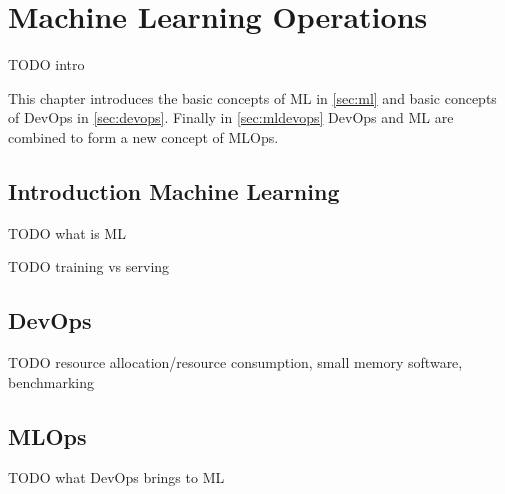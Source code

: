 \chapter{Machine Learning Operations}

TODO intro

This chapter introduces the basic concepts of ML in \autoref{sec:ml} and basic concepts of DevOps in \autoref{sec:devops}. Finally in \autoref{sec:mldevops} DevOps and ML are combined to form a new concept of MLOps.

\section{Introduction Machine Learning}
\label{sec:ml}

TODO what is ML

TODO training vs serving

\section{DevOps}
\label{sec:devops}

TODO resource allocation/resource consumption, small memory software, benchmarking

\section{MLOps}
\label{sec:mldevops}

TODO what DevOps brings to ML

